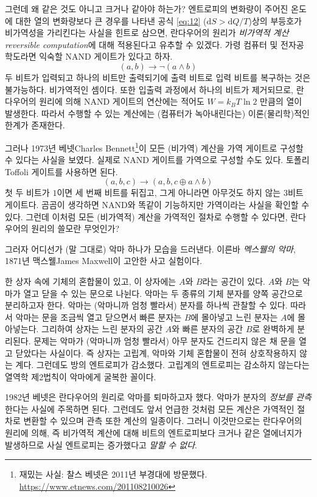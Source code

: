 \documentclass[a4paper,chapter,atbegshi]{oblivoir}
\begin{document}
그런데 왜 같은 것도 아니고 크거나 같아야 하는가? 엔트로피의 변화량이 주어진 온도에
대한 열의 변화량보다 큰 경우를 나타낸 공식 \ref{eq:12} ($\textrm{d}S>
\textrm{d}Q/T$)상의 부등호가 비가역성을 가리킨다는 사실을 힌트로 삼으면,
란다우어의 원리가 \emph{비가역적 계산\tiny reversible computation}에 대해 
적용된다고 유추할 수 있겠다. 가령 컴퓨터 및 전자공학도라면 익숙할 NAND 게이트가
있다고 하자. 
\[
  (a,b) \rightarrow \neg(a \wedge b)
\]
두 비트가 입력되고 하나의 비트만 출력되기에 출력 비트로 입력 비트를 복구하는
것은 불가능하다. 비가역적인 셈이다. 또한 입출력 과정에서 하나의 비트가 제거되므로,
란다우어의 원리에 의해 NAND 게이트의 연산에는 적어도 $W=k_BT\ln2$ 만큼의 열이
발생한다. 따라서 수행할 수 있는 계산에는 (컴퓨터가 녹아내린다는) 이론(물리학)적인
한계가 존재한다. 

그러나 1973년 베넷{\tiny Charles Bennett}\footnote{재밌는 사실: 찰스 베넷은 2011년
부경대에 방문했다. \url{https://www.etnews.com/201108210026}}이 
모든 (비가역) 계산을 가역 게이트로 구성할 수 있다는 사실을 보였다. 
실제로 NAND 게이트를 가역으로 구성할 수도 있다. 토폴리{\tiny Toffoli} 게이트를
사용하면 된다. 
\[
  (a,b,c)\rightarrow(a,b,c\oplus a \wedge b)
\]
첫 두 비트가 $1$이면 세 번째 비트를 뒤집고, 그게 아니라면 아무것도
하지 않는 $3$비트 게이트다. 곰곰이 생각하면 NAND와 똑같이 기능하지만 가역이라는
사실을 확인할 수 있다. 그런데 이처럼 모든 (비가역적) 계산을 가역적인 절차로
수행할 수 있다면, 란다우어의 원리의 쓸모란 무엇인가? 

그러자 어디선가 (말 그대로) 악마 하나가 모습을 드러낸다. 이른바 
\emph{멕스웰의 악마}, 1871년 맥스웰{\tiny James Maxwell}이 고안한 사고 실험이다. 

한 상자 속에 기체의 혼합물이 있고, 이 상자에는 $A$와 $B$라는 공간이 있다.
$A$와 $B$는 악마가 열고 닫을 수 있는 문으로 나뉜다. 악마는 두 종류의 기체 분자를
양쪽 공간으로 분리하고자 한다. 악마는 (악마니까 엄청 빨라서) 분자를 하나씩 관찰할
수 있다. 따라서 악마는 문을 조금씩 열고 닫으면서 빠른 분자는 $B$에 몰아넣고 느린
분자는 $A$에 몰아넣는다. 그리하여 상자는 느린 분자의 공간 $A$와 빠른 분자의 공간
$B$로 완벽하게 분리된다. 문제는 악마가 (악마니까 엄청 빨라서) 아무 분자도
건드리지 않은 채 문을 열고 닫았다는 사실이다. 즉 상자는 고립계, 악마와 기체
혼합물이 전혀 상호작용하지 않는 계다. 그런데도 방의 엔트로피가 감소했다.
고립계의 엔트로피는 감소하지 않는다는 열역학 제2법칙이 악마에게 굴복한 꼴이다. 

1982년 베넷은 란다우어의 원리로 악마를 퇴마하고자 했다. 악마가 분자의
\emph{정보를 관측}한다는 사실에 주목하면 된다. 그런데도 앞서 언급한 것처럼 모든
계산은 가역적인 절차로 변환할 수 있으며 관측 또한 계산의 일종이다. 그러니 
이것만으로는 란다우어의 원리에 의해, 즉 비가역적 계산에 대해 비트의 엔트로피보다
크거나 같은 열에너지가 발생하므로 사실 엔트로피는 증가했다고 \emph{말할 수 없다}.
\end{document}
